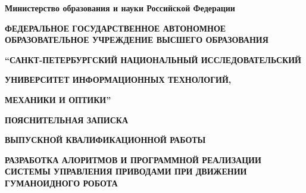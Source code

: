 \documentclass[14pt,a4paper]{report}
\title{}
\author{Ивин А. Г.}
\date{2015-05-10}
\begin{document}
\begin{center}
    \textbf{Министерство образования и науки Российской Федерации}

    {\fontsize{8pt}{10pt} \selectfont \textbf{ФЕДЕРАЛЬНОЕ ГОСУДАРСТВЕННОЕ АВТОНОМНОЕ ОБРАЗОВАТЕЛЬНОЕ УЧРЕЖДЕНИЕ ВЫСШЕГО ОБРАЗОВАНИЯ}}

    \textbf{“САНКТ-ПЕТЕРБУРГСКИЙ НАЦИОНАЛЬНЫЙ ИССЛЕДОВАТЕЛЬСКИЙ }

    \textbf{УНИВЕРСИТЕТ ИНФОРМАЦИОННЫХ ТЕХНОЛОГИЙ, }

    \textbf{МЕХАНИКИ И ОПТИКИ”}

    \bigskip
    \textbf{ПОЯСНИТЕЛЬНАЯ ЗАПИСКА}

    \textbf{ВЫПУСКНОЙ КВАЛИФИКАЦИОННОЙ РАБОТЫ}

    \vspace{4cm}

    \textbf{\large РАЗРАБОТКА АЛОРИТМОВ И ПРОГРАММНОЙ РЕАЛИЗАЦИИ СИСТЕМЫ УПРАВЛЕНИЯ ПРИВОДАМИ ПРИ ДВИЖЕНИИ ГУМАНОИДНОГО РОБОТА}
\end{center}

\vspace{4cm}
\end{document}
